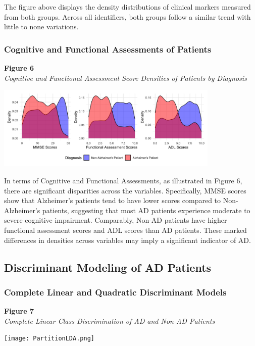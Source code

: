 \documentclass[12pt]{article}
\begin{document}
The figure above displays the density distributions of clinical markers measured from both groups. Across all identifiers, both groups follow a similar trend with little to none variations. 

\subsubsection{Cognitive and Functional Assessments of Patients}
\noindent
\textbf{Figure 6}\\
\textit{Cognitive and Functional Assessment Score Densities of Patients by Diagnosis}
\begin{center}
    \includegraphics[width = 0.8\textwidth]{Cognitive and Functional Distributions.png}
\end{center}

In terms of Cognitive and Functional Assessments, as illustrated in Figure 6, there are significant disparities across the variables. Specifically, MMSE scores show that Alzheimer's patients tend 
to have lower scores compared to Non-Alzheimer's patients, suggesting that most AD patients experience moderate to severe cognitive impairment. Comparably, Non-AD patients have higher functional assessment
scores and ADL scores than AD patients. These marked differences in densities across variables may imply a significant indicator of AD. 

\subsection{Discriminant Modeling of AD Patients}
\subsubsection{Complete Linear and Quadratic Discriminant Models}
\noindent
\textbf{Figure 7}\\
\textit{Complete Linear Class Discrimination of AD and Non-AD Patients}
\begin{center}
    \texttt{[image: PartitionLDA.png]}
\end{center}
\end{document}

